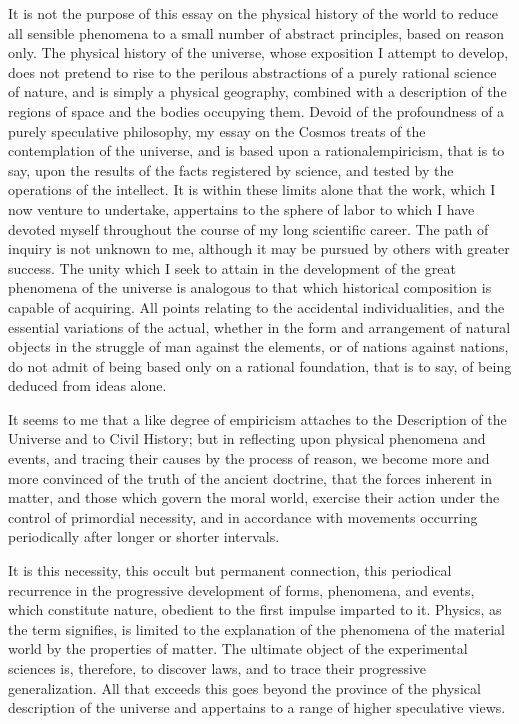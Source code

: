 It is not the purpose of this essay on the physical history of the world to reduce all sensible phenomena to a small number of abstract principles, based on reason only. The physical history of the universe, whose exposition I attempt to develop, does not pretend to rise to the perilous abstractions of a purely rational science of nature, and is simply a physical geography, combined with a description of the regions of space and the bodies occupying them. Devoid of the profoundness of a purely speculative philosophy, my essay on the Cosmos treats of the contemplation of the universe, and is based upon a rationalempiricism, that is to say, upon the results of the facts registered by science, and tested by the operations of the intellect. It is within these limits alone that the work, which I now venture to undertake, appertains to the sphere of labor to which I have devoted myself throughout the course of my long scientific career. The path of inquiry is not unknown to me, although it may be pursued by others with greater success. The unity which I seek to attain in the development of the great phenomena of the universe is analogous to that which historical composition is capable of acquiring. All points relating to the accidental individualities, and the essential variations of the actual, whether in the form and arrangement of natural objects in the struggle of man against the elements, or of nations against nations, do not admit of being based only on a rational foundation, that is to say, of being deduced from ideas alone.

It seems to me that a like degree of empiricism attaches to the Description of the Universe and to Civil History; but in reflecting upon physical phenomena and events, and tracing their causes by the process of reason, we become more and more convinced of the truth of the ancient doctrine, that the forces inherent in matter, and those which govern the moral world, exercise their action under the control of primordial necessity, and in accordance with movements occurring periodically after longer or shorter intervals.

It is this necessity, this occult but permanent connection, this periodical recurrence in the progressive development of forms, phenomena, and events, which constitute nature, obedient to the first impulse imparted to it. Physics, as the term signifies, is limited to the explanation of the phenomena of the material world by the properties of matter. The ultimate object of the experimental sciences is, therefore, to discover laws, and to trace their progressive generalization. All that exceeds this goes beyond the province of the physical description of the universe and appertains to a range of higher speculative views.

